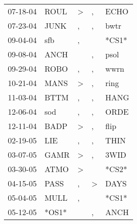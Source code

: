 \begin{supertabular}{p{0.07\textwidth}p{0.06\textwidth}p{0.02\textwidth}p{0.02\textwidth}p{0.06\textwidth}}
          07-18-04\textsuperscript{} &           ROUL\textsuperscript{} &     \textgreater &             , &           ECHO\textsuperscript{} \\
          07-23-04\textsuperscript{} &           JUNK\textsuperscript{} &                , &             , &           bwtr\textsuperscript{} \\
          09-04-04\textsuperscript{} &            sfb\textsuperscript{} &                , &               &                            *CS1* \\
          09-08-04\textsuperscript{} &           ANCH\textsuperscript{} &                  &             , &           psol\textsuperscript{} \\
          09-29-04\textsuperscript{} &           ROBO\textsuperscript{} &                , &             , &           wwrn\textsuperscript{} \\
          10-21-04\textsuperscript{} &           MANS\textsuperscript{} &     \textgreater &             , &           ring\textsuperscript{} \\
          11-03-04\textsuperscript{} &           BTTM\textsuperscript{} &                , &             , &           HANG\textsuperscript{} \\
          12-06-04\textsuperscript{} &            sod\textsuperscript{} &                , &             , &           ORDE\textsuperscript{} \\
          12-11-04\textsuperscript{} &           BADP\textsuperscript{} &     \textgreater &             , &           flip\textsuperscript{} \\
          02-19-05\textsuperscript{} &            LIE\textsuperscript{} &                , &             , &           THIN\textsuperscript{} \\
          03-07-05\textsuperscript{} &           GAMR\textsuperscript{} &     \textgreater &             , &           3WID\textsuperscript{} \\
          03-30-05\textsuperscript{} &           ATMO\textsuperscript{} &     \textgreater &               &                            *CS2* \\
          04-15-05\textsuperscript{} &           PASS\textsuperscript{} &                , &  \textgreater &           DAYS\textsuperscript{} \\
          05-04-05\textsuperscript{} &           MULL\textsuperscript{} &                , &               &                            *CS1* \\
          05-12-05\textsuperscript{} &                            *OS1* &                  &             , &           ANCH\textsuperscript{} \\

\end{supertabular}
